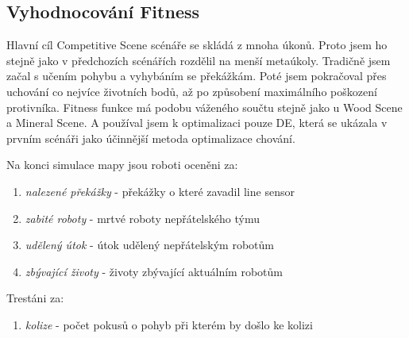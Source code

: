 \subsection*{Vyhodnocování Fitness}
Hlavní cíl Competitive Scene scénáře se skládá z mnoha úkonů. Proto jsem ho stejně jako v předchozích scénářích rozdělil na menší metaúkoly. Tradičně jsem začal s učením pohybu a vyhybáním se překážkám. Poté jsem pokračoval přes uchování co nejvíce životních bodů, až po způsobení maximálního poškození protivníka. Fitness funkce má podobu váženého součtu stejně jako u Wood Scene a Mineral Scene. A používal jsem k optimalizaci pouze DE, která se ukázala v prvním scénáři jako účinnější metoda optimalizace chování. 
\par 
Na konci simulace mapy jsou roboti oceněni za:  
\begin{enumerate}
	\item \textit{nalezené překážky} - překážky o které zavadil line sensor
	\item \textit{zabité roboty} - mrtvé roboty nepřátelského týmu
	\item \textit{udělený útok} - útok udělený nepřátelským robotům 
	\item \textit{zbývající životy} - životy zbývající aktuálním robotům
\end{enumerate}
Trestáni za:
\begin{enumerate}
	\item \textit{kolize} - počet pokusů o pohyb při kterém by došlo ke kolizi 
\end{enumerate}

